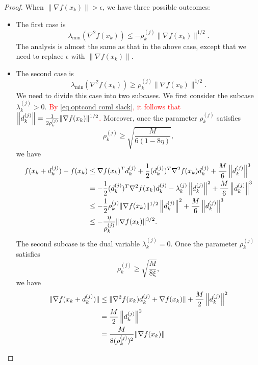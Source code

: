 \begin{proof}
    When $\|\nabla f(x_k)\| >\epsilon$, we have three possible outcomes:
    \begin{itemize}
        \item The first case is
              $$\lambda_{\min}(\nabla^2 f(x_k)) \leq -\rho_k^{(j)}\|\nabla f(x_k)\|^{1/2}.$$
              The analysis is almost the same as that in the above case, except that we need to replace $\epsilon$ with $\|\nabla f(x_k)\|$.
        \item The second case is
              $$\lambda_{\min}(\nabla^2 f(x_k)) \geq \rho_k^{(j)}\|\nabla f(x_k)\|^{1/2}.$$
              We need to divide this case into two subcases. We first consider the subcase $\lambda_k^{(j)}>0$. \textcolor{red}{By \eqref{eq.optcond coml slack}, it follows that $\left\|d_k^{(j)}\right\| = \frac{1}{2\rho_k^{(j)}}\|\nabla f(x_k)\|^{1/2}$.} Moreover, once the parameter $\rho_k^{(j)}$ satisfies
    $$
        \rho_k^{(j)} \geq \sqrt{\frac{M}{6(1-8\eta)}},
    $$
    we have
              \begin{align}
                  \nonumber
                  f(x_k+d_k^{(j)})-f(x_k) & \leq \nabla f(x_k)^Td_k^{(j)}+\frac{1}{2}(d_k^{(j)})^T \nabla^2 f(x_k)d_k^{(j)}+\frac{M}{6}\left\|d_k^{(j)}\right\|^3                \\
                  \nonumber
                                          & = -\frac{1}{2}(d_k^{(j)})^T \nabla^2 f(x_k)d_k^{(j)} -\lambda_k^{(j)}\left\|d_k^{(j)}\right\|^2+\frac{M}{6}\left\|d_k^{(j)}\right\|^3 \\
                  \nonumber
                                          & \leq -\frac{1}{2}\rho_k^{(j)}\|\nabla f(x_k)\|^{1/2}\left\|d_k^{(j)}\right\|^2+\frac{M}{6}\left\|d_k^{(j)}\right\|^3                      \\
                                          & \leq -\frac{\eta}{\rho_k^{(j)}}\|\nabla f(x_k)\|^{3/2}.
                  \label{eq.function decrease adaptive case2}
              \end{align}
              The second subcase is the dual variable $\lambda_k^{(j)} = 0$. Once the parameter $\rho_k^{(j)}$ satisfies
    $$
        \rho_k^{(j)} \geq \sqrt{\frac{M}{8\xi}},
    $$
    we have
              \begin{align}
                  \nonumber
                  \|\nabla f(\xk+\dk^{(j)})\| & \leq \|\nabla^2 f(x_k)\dk^{(j)}+\nabla f(x_k)\| +\frac{M}{2}\left\|\dk^{(j)}\right\|^2 \\
                  \nonumber
                                              & = \frac{M}{2}\left\|\dk^{(j)}\right\|^2    \\       \nonumber      &= \frac{M}{8 (\rho_k^{(j)})^2}\|\nabla f(x_k) \|\\

\end{align}
\end{itemize}
\end{proof}
